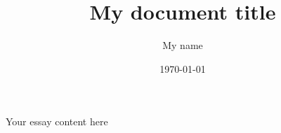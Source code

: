 \documentclass[12pt]{article}
\title{My document title}
\author{My name}
\date{\today}
\begin{document}
\maketitle
\begin{abstract}
\end{abstract}
Your essay content here


\end{document}
